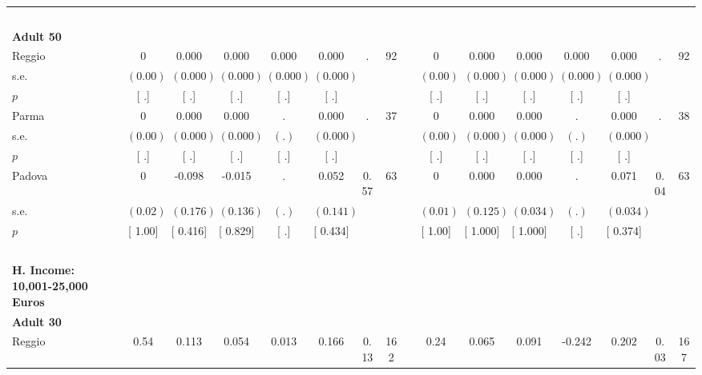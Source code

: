 \begin{longtable}{L{8em} c c c c c c c p{1em} c c c c c c c}
~\\[1em]
\quad \quad \textbf{Adult 50} & & & & & & & & & & & & & & & \\* 
\quad \quad \quad Reggio& 0 &     0.000 &     0.000 &     0.000 &     0.000 &         . &        92 & & 0 &     0.000 &     0.000 &     0.000 &     0.000 &         . &        92  \\*
\quad \quad \quad \quad s.e.& $ (     0.00)$ & $ (    0.000)$ & $ (    0.000)$ & $ (    0.000)$ & $ (    0.000)$ & & & & $ (     0.00)$ & $ (    0.000)$ & $ (    0.000)$ & $ (    0.000)$ & $ (    0.000)$ & &  \\*
\quad \quad \quad \quad $ p$ & [        .] & [        .] & [        .] & [        .] & [        .] & & & & [        .] & [        .] & [        .] & [        .] & [        .] & &  \\[1em]
\quad \quad \quad Parma& 0 &     0.000 &     0.000 &         . &     0.000 &         . &        37 & & 0 &     0.000 &     0.000 &         . &     0.000 &         . &        38  \\*
\quad \quad \quad \quad s.e.& $ (     0.00)$ & $ (    0.000)$ & $ (    0.000)$ & $ (        .)$ & $ (    0.000)$ & & & & $ (     0.00)$ & $ (    0.000)$ & $ (    0.000)$ & $ (        .)$ & $ (    0.000)$ & &  \\*
\quad \quad \quad \quad $ p$ & [        .] & [        .] & [        .] & [        .] & [        .] & & & & [        .] & [        .] & [        .] & [        .] & [        .] & &  \\[1em]
\quad \quad \quad Padova& 0 &    -0.098 &    -0.015 &         . &     0.052 &      0.57 &        63 & & 0 &     0.000 &     0.000 &         . &     0.071 &      0.04 &        63  \\*
\quad \quad \quad \quad s.e.& $ (     0.02)$ & $ (    0.176)$ & $ (    0.136)$ & $ (        .)$ & $ (    0.141)$ & & & & $ (     0.01)$ & $ (    0.125)$ & $ (    0.034)$ & $ (        .)$ & $ (    0.034)$ & &  \\*
\quad \quad \quad \quad $ p$ & [     1.00] & [    0.416] & [    0.829] & [        .] & [    0.434] & & & & [     1.00] & [    1.000] & [    1.000] & [        .] & [    0.374] & &  \\[1em]
~\\[1em]
\textbf{H. Income: 10,001-25,000 Euros} \\*
\quad \quad \textbf{Adult 30} & & & & & & & & & & & & & & & \\* 
\quad \quad \quad Reggio& 0.54 &     0.113 &     0.054 &     0.013 &     0.166 &      0.13 &       162 & & 0.24 &     0.065 &     0.091 &    -0.242 & $ \mathbf{    0.202}$ &      0.03 &       167  \\*

\end{longtable}
